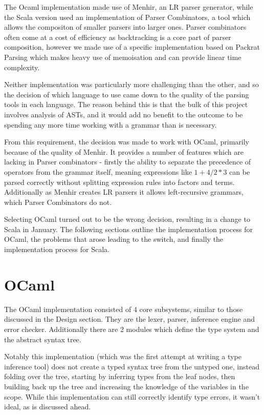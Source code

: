 \documentclass[british, twoside]{bhamthesis}
\theoremstyle{definition}
\begin{document}
  The Ocaml implementation made use of Menhir, an LR parser generator, while the Scala version used an implementation of Parser Combinators\autocite{Hutton1996}, a tool which allows the compositon of smaller parsers into larger ones. Parser combinators often come at a cost of efficiency as backtracking is a core part of parser composition, however we made use of a specific implementation based on Packrat Parsing\autocite{Ford2006} which makes heavy use of memoisation and can provide linear time complexity.

  Neither implementation was particularly more challenging than the other, and so the decision of which language to use came down to the quality of the parsing tools in each language. The reason behind this is that the bulk of this project involves analysis of ASTs, and it would add no benefit to the outcome to be spending any more time working with a grammar than is necessary.

  From this requirement, the decision was made to work with OCaml, primarily because of the quality of Menhir. It provides a number of features which are lacking in Parser combinators - firstly the ability to separate the precedence of operators from the grammar itself, meaning expressions like $1 + 4 / 2 * 3$ can be parsed correctly without splitting expression rules into factors and terms. Additionally as Menhir creates LR parsers it allows left-recursive grammars, which Parser Combinators do not.

  Selecting OCaml turned out to be the wrong decision, resulting in a change to Scala in January. The following sections outline the implementation process for OCaml, the problems that arose leading to the switch, and finally the implementation process for Scala.

  \section{OCaml}
    The OCaml implementation consisted of 4 core subsystems, similar to those discussed in the Design section. They are the lexer, parser, inference engine and error checker. Additionally there are 2 modules which define the type system and the abstract syntax tree.

    Notably this implementation (which was the first attempt at writing a type inference tool) does not create a typed syntax tree from the untyped one, instead folding over the tree, starting by inferring types from the leaf nodes, then building back up the tree and increasing the knowledge of the variables in the scope. While this implementation can still correctly identify type errors, it wasn't ideal, as is discussed ahead.
\end{document}
